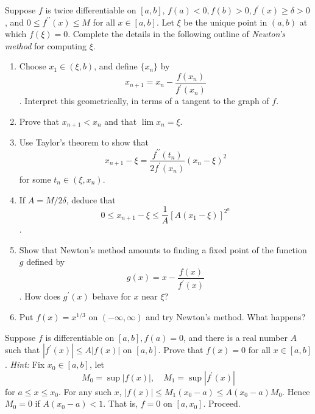   \begin{exercise}[Rudin 5.25]
    Suppose $f$ is twice differentiable on $[a, b]$, $f(a) < 0, f(b) > 0, f^\prime(x) \ge \delta > 0$, and $0 \le f^{\prime\prime}(x) \le M$ for all $x \in [a, b]$. Let $\xi$ be the unique point in $(a, b)$ at which $f(\xi) = 0$. Complete the details in the following outline of \textit{Newton's method} for computing $\xi$.
    \begin{enumerate}
      \item[(a)] Choose $x_1 \in (\xi, b)$, and define $\{x_n\}$ by
        \begin{equation}
          x_{n+1} = x_n - \frac{f(x_n)}{f^\prime(x_n)}
        \end{equation}
       . Interpret this geometrically, in terms of a tangent to the graph of $f$.
      \item[(b)] Prove that $x_{n+1} < x_n$ and that $\lim x_n = \xi$.
      \item[(c)] Use Taylor's theorem to show that
        \begin{equation}
          x_{n+1} - \xi = \frac{f^{\prime\prime}(t_n)}{2f^\prime(x_n)}(x_n - \xi)^2
        \end{equation}
        for some $t_n \in (\xi, x_n)$.
      \item[(d)] If $A = M/2\delta$, deduce that
        \begin{equation}
          0 \le x_{n+1} - \xi \le \frac{1}{A} [A(x_1 - \xi)]^{2^n}
        \end{equation}
       .
      \item[(e)] Show that Newton's method amounts to finding a fixed point of the function $g$ defined by
        \begin{equation}
          g(x) = x - \frac{f(x)}{f^\prime(x)}
        \end{equation}
       . How does $g^\prime(x)$ behave for $x$ near $\xi$?
      \item[(f)] Put $f(x) = x^{1/3}$ on $(-\infty, \infty)$ and try Newton's method. What happens?
    \end{enumerate}
  \end{exercise}
  \begin{solution}

  \end{solution}

  \begin{exercise}[Rudin 5.26]
    Suppose $f$ is differentiable on $[a, b], f(a) = 0$, and there is a real number $A$ such that $|f^\prime(x)| \le A|f(x)|$ on $[a, b]$. Prove that $f(x) = 0$ for all $x \in [a, b]$. \textit{Hint:} Fix $x_0 \in [a, b]$, let
    \begin{equation}
      M_0 = \sup|f(x)|, \quad M_1 = \sup|f^\prime(x)|
    \end{equation}
    for $a \le x \le x_0$. For any such $x$, $|f(x)| \le M_1(x_0 - a) \le A(x_0 - a)M_0$. Hence $M_0 = 0$ if $A(x_0 - a) < 1$. That is, $f = 0$ on $[a, x_0]$. Proceed.
  \end{exercise}
  \begin{solution}

  \end{solution}

